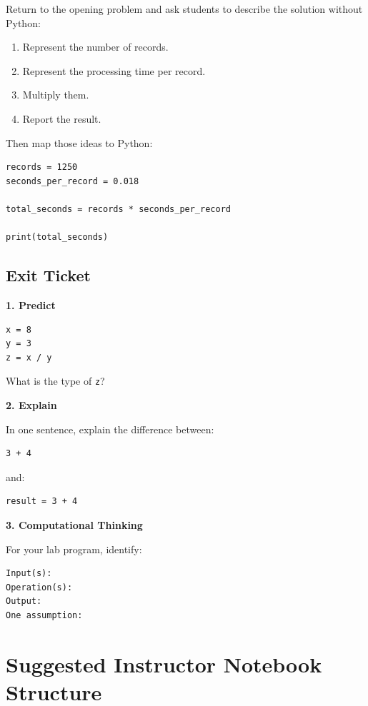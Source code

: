 \documentclass[11pt]{article}
\begin{document}
Return to the opening problem and ask students to describe the solution without Python:

\begin{enumerate}
    \item Represent the number of records.
    \item Represent the processing time per record.
    \item Multiply them.
    \item Report the result.
\end{enumerate}

Then map those ideas to Python:

\begin{lstlisting}
records = 1250
seconds_per_record = 0.018

total_seconds = records * seconds_per_record

print(total_seconds)
\end{lstlisting}

\subsection*{Exit Ticket}

\textbf{1. Predict}

\begin{lstlisting}
x = 8
y = 3
z = x / y
\end{lstlisting}

What is the type of \texttt{z}?

\medskip

\textbf{2. Explain}

In one sentence, explain the difference between:

\begin{lstlisting}
3 + 4
\end{lstlisting}

and:

\begin{lstlisting}
result = 3 + 4
\end{lstlisting}

\medskip

\textbf{3. Computational Thinking}

For your lab program, identify:

\begin{verbatim}
Input(s):
Operation(s):
Output:
One assumption:
\end{verbatim}

\section*{Suggested Instructor Notebook Structure}
\end{document}
